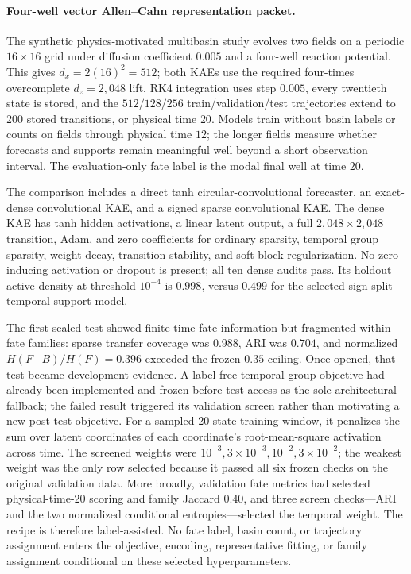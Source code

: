 \paragraph{Four-well vector Allen--Cahn representation packet.}
The synthetic physics-motivated multibasin study evolves two fields on a periodic
$16\times16$ grid under diffusion coefficient $0.005$ and a four-well
reaction potential. This gives $d_x=2(16)^2=512$; both KAEs use the required
four-times overcomplete $d_z=2{,}048$ lift. RK4 integration uses step
$0.005$, every twentieth state is stored, and the $512/128/256$
train/validation/test trajectories extend to 200 stored transitions, or
physical time $20$. Models train without basin labels or counts on fields
through physical time $12$; the longer fields measure whether forecasts and
supports remain meaningful well beyond a short observation interval. The
evaluation-only fate label is the modal final well at time $20$.

The comparison includes a direct tanh circular-convolutional forecaster, an
exact-dense convolutional KAE, and a signed sparse convolutional KAE. The
dense KAE has tanh hidden activations, a linear latent output, a full
$2{,}048\times2{,}048$ transition, Adam, and zero coefficients for ordinary
sparsity, temporal group sparsity, weight decay, transition stability, and
soft-block regularization. No zero-inducing activation or dropout is present;
all ten dense audits pass. Its holdout active density at threshold $10^{-4}$
is $0.998$, versus $0.499$ for the selected sign-split temporal-support model.

The first sealed test showed finite-time fate information but fragmented
within-fate families: sparse transfer coverage was $0.988$, ARI was $0.704$, and
normalized $H(F\mid B)/H(F)=0.396$ exceeded the frozen $0.35$ ceiling. Once
opened, that test became development evidence. A label-free temporal-group
objective had already been implemented and frozen before test access as the
sole architectural fallback; the failed result triggered its validation
screen rather than motivating a new post-test objective. For a
sampled 20-state training window, it penalizes the sum over latent coordinates
of each coordinate's root-mean-square activation across time. The screened
weights were $10^{-3},3\times10^{-3},10^{-2},3\times10^{-2}$; the weakest
weight was the only row selected because it passed all six frozen checks on
the original validation data. More broadly, validation fate metrics had
selected physical-time-20 scoring and family Jaccard $0.40$, and three screen
checks---ARI and the two normalized conditional entropies---selected the
temporal weight. The recipe is therefore label-assisted. No fate label, basin
count, or trajectory assignment enters the objective, encoding,
representative fitting, or family assignment conditional on these selected
hyperparameters.

